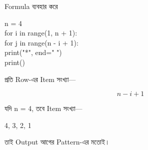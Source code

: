 \begin{codeoutputbox}{Formula ব্যবহার করে}

\noindent
\begin{minipage}[t]{0.56\linewidth}
\codeheading

\begin{english}
\ttfamily
n = 4\\
for i in range(1, n + 1):\\
\hspace*{4mm}for j in range(n - i + 1):\\
\hspace*{8mm}print("*", end=" ")\\
\hspace*{4mm}print()
\end{english}

\end{minipage}
\hfill
\begin{minipage}[t]{0.40\linewidth}
\outputheading

প্রতি Row-এর Item সংখ্যা—

\[
n-i+1
\]

যদি
\textenglish{\ttfamily n = 4},
তবে Item সংখ্যা—

\begin{center}
4, 3, 2, 1
\end{center}

তাই Output আগের Pattern-এর মতোই।

\end{minipage}

\end{codeoutputbox}



